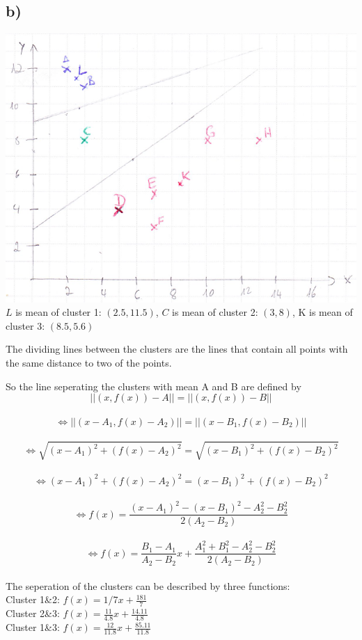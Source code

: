 \subsection*{b)}
\begin{center}
  \includegraphics[width=0.7\linewidth]{E4_diag}\\
  \small $L$ is mean of cluster 1: $(2.5,11.5)$, $C$ is mean of cluster 2: $(3,8)$, K is mean of cluster 3: $(8.5,5.6)$
\end{center}

The dividing lines between the clusters are the lines that contain all points with the same distance to two of the points.

So the line seperating the clusters with mean A and B are defined by 
  \[||\left(x,f(x)\right)-A|| = ||\left(x,f(x)\right)-B||\]\\
  \[\Leftrightarrow ||(x-A_1,f(x)-A_2)||=||(x-B_1,f(x)-B_2)||\]\\
  \[\Leftrightarrow \sqrt{(x-A_1)^2 + (f(x)-A_2)^2}=\sqrt{(x-B_1)^2 + (f(x)-B_2)^2}\]\\
  \[\Leftrightarrow (x-A_1)^2 + (f(x)-A_2)^2=(x-B_1)^2 + (f(x)-B_2)^2\]\\
  \[\Leftrightarrow f(x) = \frac{(x-A_1)^2-(x-B_1)^2-A_2^2-B_2^2}{2(A_2-B_2)}\]\\
  \[\Leftrightarrow f(x) = \frac{B_1-A_1}{A_2-B_2}x +\frac{A_1^2+B_1^2-A_2^2-B_2^2}{2(A_2-B_2)}\]\\
  
  The seperation of the clusters can be described by three functions:\\
  Cluster 1\&2: $f(x) = 1/7x+\frac{181}{7}$\\
  Cluster 2\&3: $f(x) = \frac{11}{4.8}x+\frac{14.11}{4.8}$\\
  Cluster 1\&3: $f(x) = \frac{12}{11.8}x+\frac{85.11}{11.8}$
  
